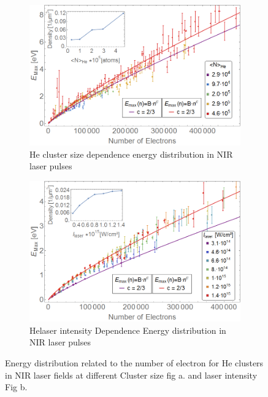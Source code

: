  \begin{figure}[h!]
\centering
\begin{subfigure}[t]{0.65\textwidth}
\caption{He cluster size dependence energy distribution in NIR laser pulses}
\includegraphics[width=1\textwidth]{../Images/results/NI_He_Dropletsize/vinned.png} 
\end{subfigure} 
\hfill

\centering
\begin{subfigure}[t]{0.65\textwidth}
\caption{Helaser intensity Dependence Energy distribution in NIR laser pulses}
\includegraphics[width=1\textwidth]{../Images/results/NIR_He_intensityscan/binned.png} 
\end{subfigure} 
\hfill
\caption[Energy-Number of electrons relation. NIR Helium Droplets]{Energy distribution related to the number of electron for He clusters in NIR laser fields at different Cluster size fig a. and laser intensity Fig b.}
\label{fig:NIRcaxeinter}
\end{figure}


